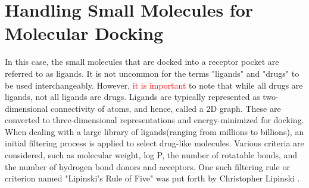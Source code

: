 \chapter*{Handling Small Molecules for Molecular Docking}
In this case, the small molecules that are docked into a receptor pocket are referred to as ligands. It is not uncommon for the terms "ligands" and "drugs" to be used interchangeably. However, \textcolor{red}{it is important} to note that while all drugs are ligands, not all ligands are drugs. Ligands are typically represented as two-dimensional connectivity of atoms, and hence, called a 2D graph. These are converted to three-dimensional representations  and energy-minimized for docking.  When dealing with a large library of ligands\cite{bib10}(ranging from millions to billions), an initial filtering process is applied to select drug-like molecules. Various criteria are considered, such as molecular weight, log P, the number of rotatable bonds, and the number of hydrogen bond donors and acceptors. One such filtering  rule or criterion named "Lipinski's  Rule of Five" was put forth by Christopher Lipinski \cite{bib11}. {} 

